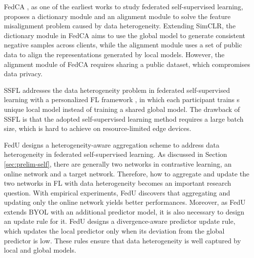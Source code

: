 \documentclass[11pt]{article}
\begin{document}
FedCA \cite{Yilun-zhang2020federated}, as one of the earliest works to study federated self-supervised learning, proposes a dictionary module and an alignment module to solve the feature misalignment problem caused by data heterogeneity. Extending SimCLR, the dictionary module in FedCA aims to use the global model to generate consistent negative samples across clients, while the alignment module uses a set of public data to align the representations generated by local models. However, the alignment module of FedCA requires sharing a public dataset, which compromises data privacy.

SSFL \cite{Yilun-he2021ssfl} addresses the data heterogeneity problem in federated self-supervised learning with a personalized FL framework \cite{Yilun-tan2022towards,Yilun-li2021ditto}, in which each participant trains s unique local model instead of training a shared global model. The drawback of SSFL is that the adopted self-supervised learning method requires a large batch size, which is hard to achieve on resource-limited edge devices.

FedU \cite{Yilun-zhuang2021collaborative} designs a heterogeneity-aware aggregation scheme to address data heterogeneity in federated self-supervised learning. As discussed in Section \ref{sec:prelim-self}, there are generally two networks in contrastive learning, an online network and a target network. Therefore, how to aggregate and update the two networks in FL with data heterogeneity becomes an important research question. With empirical experiments, FedU discovers that aggregating and updating only the online network yields better performances. Moreover, as FedU extends BYOL with an additional predictor model, it is also necessary to design an update rule for it. FedU designs a divergence-aware predictor update rule, which updates the local predictor only when its deviation from the global predictor is low. These rules ensure that data heterogeneity is well captured by local and global models.
\end{document}
